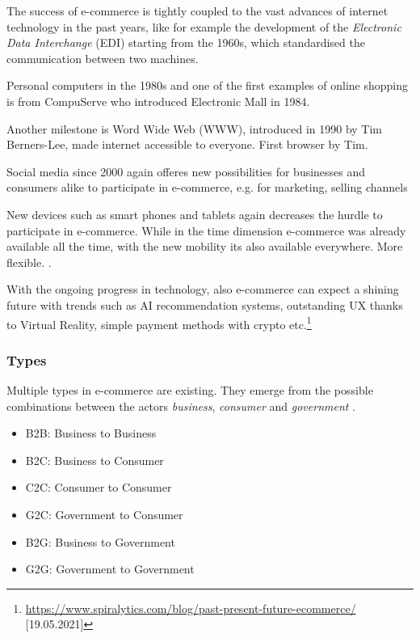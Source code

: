 
The success of e-commerce is tightly coupled to the vast advances of internet technology in the past years, like for example the development of the \textit{Electronic Data Interchange} (EDI) starting from the 1960s, which standardised the communication between two machines.

Personal computers in the 1980s and one of the first examples of online shopping is from CompuServe who introduced Electronic Mall in 1984.

Another milestone is Word Wide Web (WWW), introduced in 1990 by Tim Berners-Lee, made internet accessible to everyone.
First browser by Tim.

Social media since 2000 again offeres new possibilities for businesses and consumers alike to participate in e-commerce, e.g. for marketing, selling channels

New devices such as smart phones and tablets again decreases the hurdle to participate in e-commerce.
While in the time dimension e-commerce was already available all the time, with the new mobility its also available everywhere.
More flexible.
\cite{2019Hermogeno}.

With the ongoing progress in technology, also e-commerce can expect a shining future with trends such as AI recommendation systems, outstanding UX thanks to Virtual Reality, simple payment methods with crypto etc.\footnote{\url{https://www.spiralytics.com/blog/past-present-future-ecommerce/} [19.05.2021]}


\subsubsection{Types}

Multiple types in e-commerce are existing. They emerge from the possible combinations between the actors \textit{business}, \textit{consumer} and \textit{government} \cite{2017DosSantos}.

\begin{itemize}
\item B2B: Business to Business
\item B2C: Business to Consumer
\item C2C: Consumer to Consumer
\item G2C: Government to Consumer
\item B2G: Business to Government
\item G2G: Government to Government
\end{itemize}


